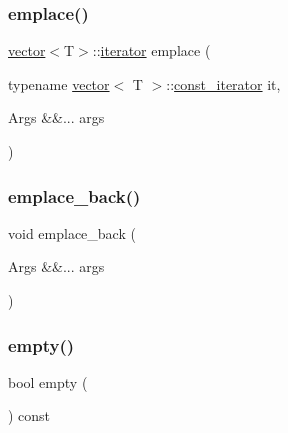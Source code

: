 \mbox{\label{classvector_a4dfbba201c3fd2ff82684d65993a7509}} 
\subsubsection{\texorpdfstring{emplace()}{emplace()}\hspace{0.1cm}{\footnotesize\ttfamily [2/2]}}
{\footnotesize\ttfamily \mbox{\hyperlink{classvector}{vector}}$<$T$>$\+::\mbox{\hyperlink{classvector_a35c955cacac6aacaa1e82874b1628865}{iterator}} emplace (\begin{DoxyParamCaption}\item[{typename \mbox{\hyperlink{classvector}{vector}}$<$ T $>$\+::\mbox{\hyperlink{classvector_a2fc97dce62b7053449cc868607540dba}{const\+\_\+iterator}}}]{it,  }\item[{Args \&\&...}]{args }\end{DoxyParamCaption})}

\mbox{\label{classvector_ac294eba73765b9a72a7399d64e8ecd9a}} 
\subsubsection{\texorpdfstring{emplace\+\_\+back()}{emplace\_back()}}
{\footnotesize\ttfamily void emplace\+\_\+back (\begin{DoxyParamCaption}\item[{Args \&\&...}]{args }\end{DoxyParamCaption})}

\mbox{\label{classvector_a3f6fc5de06a318920d84f3c3742db07f}} 
\subsubsection{\texorpdfstring{empty()}{empty()}}
{\footnotesize\ttfamily bool empty (\begin{DoxyParamCaption}{ }\end{DoxyParamCaption}) const\hspace{0.3cm}{\ttfamily [noexcept]}}

\mbox{\label{classvector_a035f0af279da4d1a1007d9df3ab05058}} 
